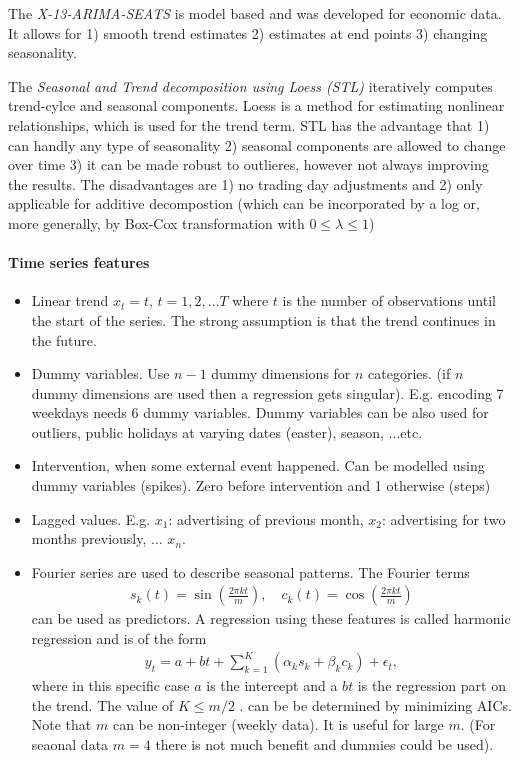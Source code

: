 \documentclass[12pt,a4paper]{article}
\begin{document}
The  \textit{X-13-ARIMA-SEATS} is model based and was developed for economic data. It allows for 1) smooth trend estimates 2)  estimates at end points 3) changing seasonality.

The  \textit{Seasonal and Trend decomposition using Loess  (STL)} \cite{stl90} iteratively computes trend-cylce and seasonal components.  Loess is a method for estimating nonlinear relationships, which is used for the trend term.  STL has the advantage that 1) can handly any type of seasonality 2) seasonal components are allowed to change over time 3) it can be made robust to outlieres, however not always improving the results. The disadvantages are 1) no trading day adjustments and 2) only applicable for additive decompostion (which can be incorporated by a log or, more generally, by Box-Cox transformation with $0 \leq \lambda \leq 1$)


\paragraph{Time series features}
\begin{itemize}
	\item Linear trend $x_t = t, \, t=1,2,\dots T$ where $t$ is the number of observations until the start of the series. The strong assumption is that the trend continues in the future.
	\item  Dummy variables. Use $n-1$ dummy dimensions for $n$ categories. (if $n$ dummy dimensions are used then a regression gets singular). E.g. encoding 7 weekdays needs 6 dummy variables. Dummy variables can be also used for outliers, public holidays at varying dates (easter), season, ...etc.
	\item Intervention, when some external event happened. Can be modelled using dummy variables (spikes). Zero before intervention and 1 otherwise (steps)
	\item Lagged values. E.g. $x_1$: advertising of previous month, $x_2$: advertising for two months previously, ... $x_n$.
	\item Fourier series are used to describe seasonal patterns.  The Fourier terms 
	\begin{align}
		s_k(t)= \sin \left( \frac{2\pi k t}{m} \right), \quad 
		c_k(t)= \cos \left( \frac{2\pi k t}{m} \right)
	\end{align}
	can be used as predictors. A regression using these features is called harmonic regression and is of the form
	\begin{align*}
		y_t = a + bt + \sum_{k=1} ^K \left ( \alpha_k s_k + \beta_k c_k \right) + \epsilon_t, 
	\end{align*}
	where in this specific case $a$ is the intercept and a $bt$ is the regression part on the trend. The value of $K \leq m/2$ .  can be be determined by minimizing AICs. 
	Note that $m$ can be non-integer (weekly data). It is useful for large $m$. (For seaonal data $m=4$ there is not much benefit and dummies could be used). 
\end{itemize}
\end{document}
